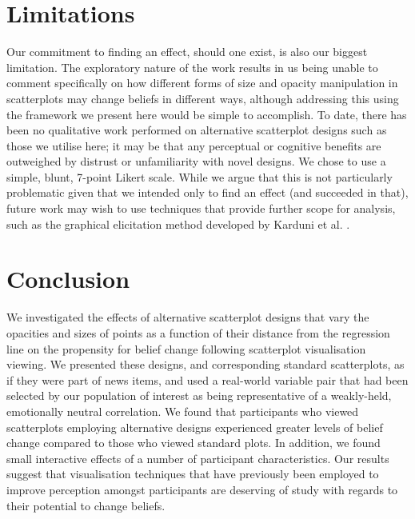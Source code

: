 \documentclass[sigconf]{acmart}
\begin{document}
\section{Limitations}\label{sec-limitations}

Our commitment to finding an effect, should one exist, is also our
biggest limitation. The exploratory nature of the work results in us
being unable to comment specifically on how different forms of size and
opacity manipulation in scatterplots may change beliefs in different
ways, although addressing this using the framework we present here would
be simple to accomplish. To date, there has been no qualitative work
performed on alternative scatterplot designs such as those we utilise
here; it may be that any perceptual or cognitive benefits are outweighed
by distrust or unfamiliarity with novel designs. We chose to use a
simple, blunt, 7-point Likert scale. While we argue that this is not
particularly problematic given that we intended only to find an effect
(and succeeded in that), future work may wish to use techniques that
provide further scope for analysis, such as the graphical elicitation
method developed by Karduni et al. \citep{karduni_2020, karduni_2023}.

\section{Conclusion}\label{sec-conclusion}

We investigated the effects of alternative scatterplot designs that vary
the opacities and sizes of points as a function of their distance from
the regression line on the propensity for belief change following
scatterplot visualisation viewing. We presented these designs, and
corresponding standard scatterplots, as if they were part of news items,
and used a real-world variable pair that had been selected by our
population of interest as being representative of a weakly-held,
emotionally neutral correlation. We found that participants who viewed
scatterplots employing alternative designs experienced greater levels of
belief change compared to those who viewed standard plots. In addition,
we found small interactive effects of a number of participant
characteristics. Our results suggest that visualisation techniques that
have previously been employed to improve perception amongst participants
are deserving of study with regards to their potential to change
beliefs.




\end{document}
